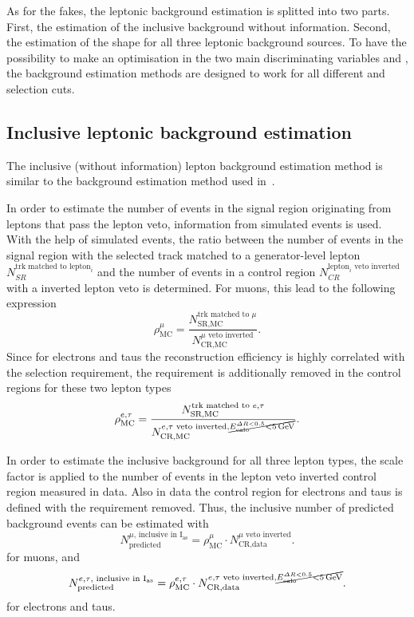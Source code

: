 As for the fakes, the leptonic background estimation is splitted into two parts.
First, the estimation of the inclusive background without \ias information.
Second, the estimation of the \ias shape for all three leptonic background sources.
To have the possibility to make an optimisation in the two main discriminating variables \pt and \ias, the background estimation methods are designed to work for all different \pt and \ias selection cuts.

\FloatBarrier
\subsection{Inclusive leptonic background estimation}
The inclusive (without \dedx information) lepton background estimation method is similar to the background estimation method used in~\cite{bib:CMS:DT_Thesis,bib:CMS:DT_8TeV_AN}.

In order to estimate the number of events in the signal region originating from leptons that pass the lepton veto, information from simulated events is used.
With the help of simulated \WJets events, the ratio \leptonscalefactor between the number of events in the signal region with the selected track matched to a generator-level lepton $N_{SR}^{\text{trk matched to lepton}_i}$
 and the number of events in a control region $N_{CR}^{\text{lepton}_i\text{ veto inverted}}$ with a inverted lepton veto is determined.
For muons, this lead to the following expression
\begin{equation*}
\rho_{\text{MC}}^{\mu} = \frac{N_{\text{SR,MC}}^{\text{trk matched to }\mu}}{N_{\text{CR,MC}}^{\mu \text{ veto inverted}}}.
\end{equation*}
Since for electrons and taus the reconstruction efficiency is highly correlated with the \ecalo selection requirement, the \ecalo requirement is additionally removed in the control regions for these two lepton types 
\begin{equation*}
\rho_{\text{MC}}^{e,\tau} = \frac{N_{\text{SR,MC}}^{\text{trk matched to }e,\tau}}{N_{\text{CR,MC}}^{e,\tau\text{ veto inverted}, \cancel{E^{\Delta R<0.5}_{\text{calo}}<5\,\text{Ge}\kern-0.06667em\text{V}}}}.
\end{equation*}

In order to estimate the inclusive background for all three lepton types, the scale factor \leptonscalefactor is applied to the number of events in the lepton veto inverted control region measured in data.
Also in data the control region for electrons and taus is defined with the \ecalo requirement removed. 
Thus, the inclusive number of predicted background events can be estimated with  
\begin{equation*}
N^{\mu \text{, inclusive in I$_{\text{as}}$}}_{\text{predicted}} = \rho_{\text{MC}}^{\mu} \cdot N_{\text{CR,data}}^{\mu\text{ veto inverted}}.
\end{equation*}
for muons, and 
\begin{equation*}
N^{e,\tau\text{, inclusive in I$_{\text{as}}$}}_{\text{predicted}} = \rho_{\text{MC}}^{e,\tau} \cdot N_{\text{CR,data}}^{e,\tau\text{ veto inverted}, \cancel{E^{\Delta R<0.5}_{\text{calo}}<5\,\text{Ge}\kern-0.06667em\text{V}}}.
\end{equation*}
for electrons and taus.

